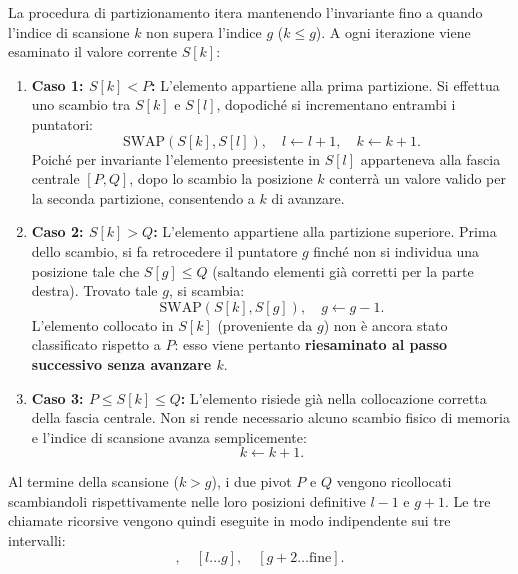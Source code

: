 La procedura di partizionamento itera mantenendo l'invariante fino a quando l'indice di scansione $k$ non supera l'indice $g$ ($k \le g$). A ogni iterazione viene esaminato il valore corrente $S[k]$:

\begin{enumerate}
  \item \textbf{Caso 1: $S[k] < P$:}
  L'elemento appartiene alla prima partizione. Si effettua uno scambio tra $S[k]$ e $S[l]$, dopodiché si incrementano entrambi i puntatori:
  \begin{equation}
    \text{SWAP}(S[k], S[l]), \quad l \leftarrow l + 1, \quad k \leftarrow k + 1.
  \end{equation}
  Poiché per invariante l'elemento preesistente in $S[l]$ apparteneva alla fascia centrale $[P, Q]$, dopo lo scambio la posizione $k$ conterrà un valore valido per la seconda partizione, consentendo a $k$ di avanzare.

  \item \textbf{Caso 2: $S[k] > Q$:}
  L'elemento appartiene alla partizione superiore. Prima dello scambio, si fa retrocedere il puntatore $g$ finché non si individua una posizione tale che $S[g] \le Q$ (saltando elementi già corretti per la parte destra). Trovato tale $g$, si scambia:
  \begin{equation}
    \text{SWAP}(S[k], S[g]), \quad g \leftarrow g - 1.
  \end{equation}
  L'elemento collocato in $S[k]$ (proveniente da $g$) non è ancora stato classificato rispetto a $P$: esso viene pertanto \textbf{riesaminato al passo successivo senza avanzare $k$}.

  \item \textbf{Caso 3: $P \le S[k] \le Q$:}
  L'elemento risiede già nella collocazione corretta della fascia centrale. Non si rende necessario alcuno scambio fisico di memoria e l'indice di scansione avanza semplicemente:
  \begin{equation}
    k \leftarrow k + 1.
  \end{equation}
\end{enumerate}

Al termine della scansione ($k > g$), i due pivot $P$ e $Q$ vengono ricollocati scambiandoli rispettivamente nelle loro posizioni definitive $l - 1$ e $g + 1$. Le tre chiamate ricorsive vengono quindi eseguite in modo indipendente sui tre intervalli:
\begin{equation}
  [\text{inizio} \dots l - 2], \quad [l \dots g], \quad [g + 2 \dots \text{fine}].
\end{equation}

